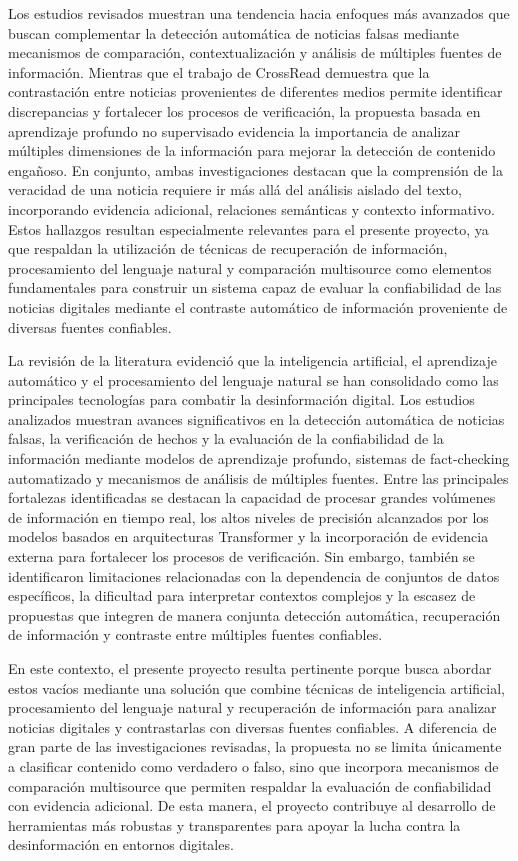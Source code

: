 \documentclass[12pt]{article}
\begin{document}
Los estudios revisados muestran una tendencia hacia enfoques más avanzados que buscan complementar la detección automática de noticias falsas mediante mecanismos de comparación, contextualización y análisis de múltiples fuentes de información. Mientras que el trabajo de CrossRead demuestra que la contrastación entre noticias provenientes de diferentes medios permite identificar discrepancias y fortalecer los procesos de verificación, la propuesta basada en aprendizaje profundo no supervisado evidencia la importancia de analizar múltiples dimensiones de la información para mejorar la detección de contenido engañoso. En conjunto, ambas investigaciones destacan que la comprensión de la veracidad de una noticia requiere ir más allá del análisis aislado del texto, incorporando evidencia adicional, relaciones semánticas y contexto informativo. Estos hallazgos resultan especialmente relevantes para el presente proyecto, ya que respaldan la utilización de técnicas de recuperación de información, procesamiento del lenguaje natural y comparación multisource como elementos fundamentales para construir un sistema capaz de evaluar la confiabilidad de las noticias digitales mediante el contraste automático de información proveniente de diversas fuentes confiables.

La revisión de la literatura evidenció que la inteligencia artificial, el aprendizaje automático y el procesamiento del lenguaje natural se han consolidado como las principales tecnologías para combatir la desinformación digital. Los estudios analizados muestran avances significativos en la detección automática de noticias falsas, la verificación de hechos y la evaluación de la confiabilidad de la información mediante modelos de aprendizaje profundo, sistemas de fact-checking automatizado y mecanismos de análisis de múltiples fuentes. Entre las principales fortalezas identificadas se destacan la capacidad de procesar grandes volúmenes de información en tiempo real, los altos niveles de precisión alcanzados por los modelos basados en arquitecturas Transformer y la incorporación de evidencia externa para fortalecer los procesos de verificación. Sin embargo, también se identificaron limitaciones relacionadas con la dependencia de conjuntos de datos específicos, la dificultad para interpretar contextos complejos y la escasez de propuestas que integren de manera conjunta detección automática, recuperación de información y contraste entre múltiples fuentes confiables.

En este contexto, el presente proyecto resulta pertinente porque busca abordar estos vacíos mediante una solución que combine técnicas de inteligencia artificial, procesamiento del lenguaje natural y recuperación de información para analizar noticias digitales y contrastarlas con diversas fuentes confiables. A diferencia de gran parte de las investigaciones revisadas, la propuesta no se limita únicamente a clasificar contenido como verdadero o falso, sino que incorpora mecanismos de comparación multisource que permiten respaldar la evaluación de confiabilidad con evidencia adicional. De esta manera, el proyecto contribuye al desarrollo de herramientas más robustas y transparentes para apoyar la lucha contra la desinformación en entornos digitales.

\vspace{1cm}



\end{document}
